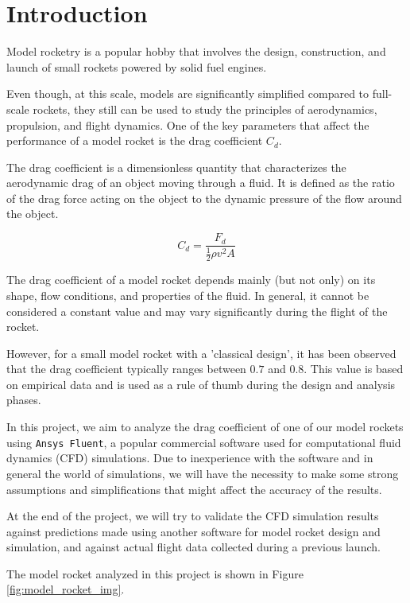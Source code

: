 \section{Introduction}
\label{sec:introduction}

Model rocketry is a popular hobby that involves the design, construction, and launch of small rockets powered by solid fuel engines.

Even though, at this scale, models are significantly simplified compared to full-scale rockets, they still can be used to study the principles of aerodynamics, propulsion, and flight dynamics.
One of the key parameters that affect the performance of a model rocket is the drag coefficient $C_d$.

The drag coefficient is a dimensionless quantity that characterizes the aerodynamic drag of an object moving through a fluid.
It is defined as the ratio of the drag force acting on the object to the dynamic pressure of the flow around the object.

\begin{equation}
    C_d = \frac{F_d}{\frac{1}{2} \rho v^2 A}
    \label{eq:drag_force}
\end{equation}

The drag coefficient of a model rocket depends mainly (but not only) on its shape, flow conditions, and properties of the fluid.
In general, it cannot be considered a constant value and may vary significantly during the flight of the rocket.

However, for a small model rocket with a 'classical design', it has been observed that the drag coefficient typically ranges between $0.7$ and $0.8$.
This value is based on empirical data and is used as a rule of thumb during the design and analysis phases.

In this project, we aim to analyze the drag coefficient of one of our model rockets using \texttt{Ansys Fluent}, a popular commercial software used for computational fluid dynamics (CFD) simulations.
Due to inexperience with the software and in general the world of simulations, we will have the necessity to make some strong assumptions and simplifications that might affect the accuracy of the results.

At the end of the project, we will try to validate the CFD simulation results against predictions made using another software for model rocket design and simulation, and against actual flight data collected during a previous launch.

The model rocket analyzed in this project is shown in Figure \ref{fig:model_rocket_img}.

